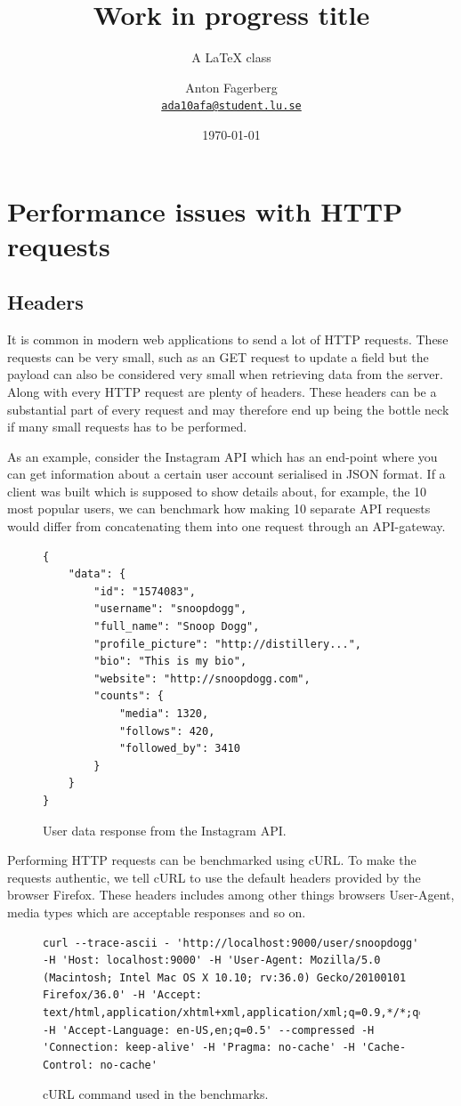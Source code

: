 \documentclass{cslthse-msc}
\author{
	Anton Fagerberg \\
	{\normalsize \href{mailto:ada10afa@student.lu.se}{\texttt{ada10afa@student.lu.se}}}
}
\title{Work in progress title}
\subtitle{A {\LaTeX} class}
\date{\today}
\begin{document}
\makefrontmatter

\chapter{Performance issues with HTTP requests}

\section{Headers}

It is common in modern web applications to send a lot of HTTP requests. These requests can be very small, such as an GET request to update a field but the payload can also be considered very small when retrieving data from the server. Along with every HTTP request are plenty of headers. These headers can be a substantial part of every request and may therefore end up being the bottle neck if many small requests has to be performed.

As an example, consider the Instagram API\cite{instagram_api} which has an end-point where you can get information about a certain user account serialised in JSON format. If a client was built which is supposed to show details about, for example, the 10 most popular users, we can benchmark how making 10 separate API requests would differ from concatenating them into one request through an API-gateway.

\begin{figure}[H]
  \centering
    \begin{lstlisting}
{
    "data": {
        "id": "1574083",
        "username": "snoopdogg",
        "full_name": "Snoop Dogg",
        "profile_picture": "http://distillery...",
        "bio": "This is my bio",
        "website": "http://snoopdogg.com",
        "counts": {
            "media": 1320,
            "follows": 420,
            "followed_by": 3410
        }
    }
}
    \end{lstlisting}
  \caption{User data response from the Instagram API.}
\end{figure}

Performing HTTP requests can be benchmarked using cURL. To make the requests authentic, we tell cURL to use the default headers provided by the browser Firefox. These headers includes among other things browsers User-Agent, media types which are acceptable responses and so on.

\begin{figure}[H]
  \centering
\begin{lstlisting}[breaklines=true]
curl --trace-ascii - 'http://localhost:9000/user/snoopdogg' -H 'Host: localhost:9000' -H 'User-Agent: Mozilla/5.0 (Macintosh; Intel Mac OS X 10.10; rv:36.0) Gecko/20100101 Firefox/36.0' -H 'Accept: text/html,application/xhtml+xml,application/xml;q=0.9,*/*;q=0.8' -H 'Accept-Language: en-US,en;q=0.5' --compressed -H 'Connection: keep-alive' -H 'Pragma: no-cache' -H 'Cache-Control: no-cache'
\end{lstlisting}
  \caption{cURL command used in the benchmarks.}
\end{figure}
\end{document}
